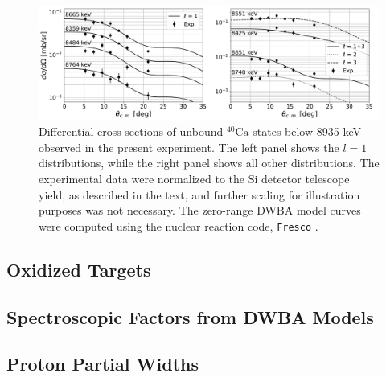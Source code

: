 \begin{figure}[t]
\centering
\includegraphics[width=6.5in]{Chapter-6/figs/unbound.png}
\caption{\label{fig:unbound_l}Differential cross-sections of unbound $^{40}\mathrm{Ca}$ states below 8935 keV observed in the present experiment. The left panel shows the $l=1$ distributions, while the right panel shows all other distributions. The experimental data were normalized to the Si detector telescope yield, as described in the text, and further scaling for illustration purposes was not necessary. The zero-range DWBA model curves were computed using the nuclear reaction code, \texttt{Fresco} \cite{Thompson1988,Fresco}.}
\end{figure}

\subsection{Oxidized Targets} \label{subsec:oxidized_cs}


\subsection{Spectroscopic Factors from DWBA Models} \label{subsec:DWBA_Spec}



\subsection{Proton Partial Widths} \label{subsec:partial_widths}



